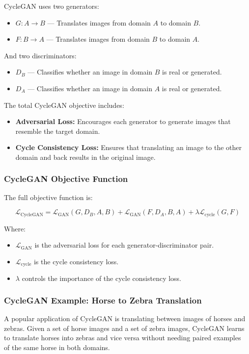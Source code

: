 CycleGAN uses two generators:
\begin{itemize}
    \item \( G: A \to B \) — Translates images from domain \( A \) to domain \( B \).
    \item \( F: B \to A \) — Translates images from domain \( B \) to domain \( A \).
\end{itemize}

And two discriminators:
\begin{itemize}
    \item \( D_B \) — Classifies whether an image in domain \( B \) is real or generated.
    \item \( D_A \) — Classifies whether an image in domain \( A \) is real or generated.
\end{itemize}

The total CycleGAN objective includes:
\begin{itemize}
    \item \textbf{Adversarial Loss:} Encourages each generator to generate images that resemble the target domain.
    \item \textbf{Cycle Consistency Loss:} Ensures that translating an image to the other domain and back results in the original image.
\end{itemize}

\subsubsection{CycleGAN Objective Function}
The full objective function is:

\[
\mathcal{L}_{\text{CycleGAN}} = \mathcal{L}_{\text{GAN}}(G, D_B, A, B) + \mathcal{L}_{\text{GAN}}(F, D_A, B, A) + \lambda \mathcal{L}_{\text{cycle}}(G, F)
\]

Where:
\begin{itemize}
    \item \( \mathcal{L}_{\text{GAN}} \) is the adversarial loss for each generator-discriminator pair.
    \item \( \mathcal{L}_{\text{cycle}} \) is the cycle consistency loss.
    \item \( \lambda \) controls the importance of the cycle consistency loss.
\end{itemize}

\subsubsection{CycleGAN Example: Horse to Zebra Translation}
A popular application of CycleGAN is translating between images of horses and zebras. Given a set of horse images and a set of zebra images, CycleGAN learns to translate horses into zebras and vice versa without needing paired examples~\cite{zhu2017unpaired} of the same horse in both domains.

